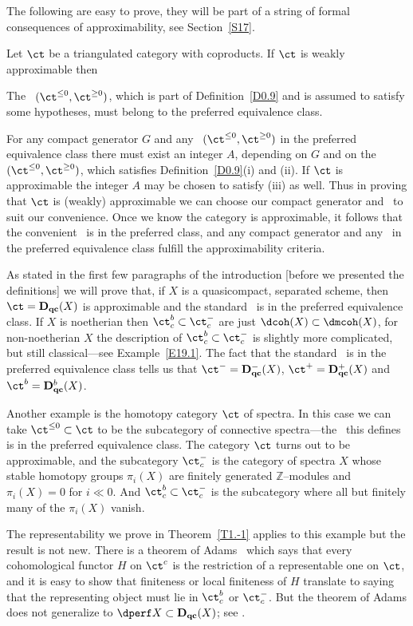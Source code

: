\documentclass[11pt]{amsart}
\newcommand{\zz}{{\mathbb Z}}
\newcommand{\Dqc}{{\mathbf D_{\text{\bf qc}}}}
\newcommand{\Dqcmi}{{\mathbf D_{\text{\bf qc}}^-}}
\newcommand{\Dqcpl}{{\mathbf D_{\text{\bf qc}}^+}}
\newcommand{\Dqcb}{{\mathbf D_{\text{\bf qc}}^b}}
\begin{document}
The following are easy to prove, they will be part of a string of
formal consequences of approximability, see Section~\ref{S17}.

Let $\ct$ be a triangulated category with coproducts.
If $\ct$ is weakly approximable then
\be
\item
  The \tstr\ $(\ct^{\leq0},\ct^{\geq0})$, which is part of
  Definition~\ref{D0.9} and is assumed to satisfy some
  hypotheses, must belong to the preferred equivalence
  class.
\item
For any compact generator $G$ and any \tstr\
$(\ct^{\leq0},\ct^{\geq0})$ in the preferred equivalence class
  there must exist an integer $A$, depending on $G$ and
on the \tstr\ $(\ct^{\leq0},\ct^{\geq0})$, which satisfies 
Definition~\ref{D0.9}(i) and (ii). If $\ct$ is approximable the
integer $A$ may be chosen to satisfy (iii) as well.
\ee
Thus in proving that $\ct$ is (weakly) approximable we can choose our compact
generator and \tstr\ to suit our convenience. Once we know the category
is approximable, it follows that the convenient \tstr\ is in the
preferred class, and any compact generator and any \tstr\ in
the preferred equivalence class fulfill the approximability
criteria.
\efac


As stated in the first few paragraphs of the introduction [before we
  presented the definitions] we will prove that,
if $X$ is a quasicompact, separated scheme,
then $\ct=\Dqc(X)$ is approximable  and the standard
\tstr\ is in the preferred equivalence class.
If $X$ is noetherian then
$\ct^b_c\subset\ct^-_c$ are just $\dcoh(X)\subset\dmcoh(X)$,
for non-noetherian $X$ the description
of $\ct^b_c\subset\ct^-_c$ is slightly more complicated,
but still classical---see Example~\ref{E19.1}.
The fact that the standard \tstr\ is in the preferred
equivalence class tells us that $\ct^-=\Dqcmi(X)$, $\ct^+=\Dqcpl(X)$
and $\ct^b=\Dqcb(X)$.

Another example is the homotopy category $\ct$ of spectra.
In this case we can take $\ct^{\leq0}\subset\ct$ to be the
subcategory of connective spectra---the \tstr\ this defines
is in the preferred equivalence class. The category $\ct$ turns out
to be approximable, and the subcategory $\ct^-_c$ is the category
of spectra $X$ whose stable homotopy groups $\pi_i(X)$
are finitely generated
$\zz$--modules and $\pi_i(X)=0$ for $i\ll0$.
And $\ct^b_c\subset\ct^-_c$ is the subcategory where all but finitely
many of the $\pi_i(X)$ vanish.

The representability we prove in Theorem~\ref{T1.-1} applies to this
example but the result is not new. There is a theorem of
Adams~\cite{Adams71} which says that every cohomological functor $H$
on $\ct^c$ is the restriction of a representable one on $\ct$,
and it is easy to show that finiteness or local finiteness
of $H$ translate to saying that the representing object must lie in
$\ct^b_c$ or $\ct^-_c$. But the theorem of Adams does not generalize
to $\dperf X\subset\Dqc(X)$; see
\cite{Neeman4,Christensen-Keller-Neeman99}.
\end{document}
